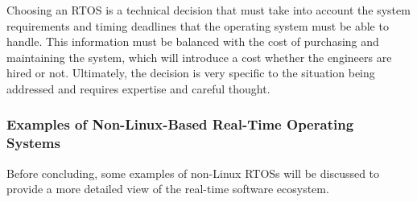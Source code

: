                 Choosing an RTOS is a technical decision that must take into
                    account the system requirements and timing deadlines that
                    the operating system must be able to handle.
                This information must be balanced with the cost of purchasing
                    and maintaining the system, which will introduce a cost
                    whether the engineers are hired or not.
                Ultimately, the decision is very specific to the situation being
                    addressed and requires expertise and careful thought.

            \subsubsection{Examples of Non-Linux-Based Real-Time Operating Systems}
            \markboth{}{}
                Before concluding, some examples of non-Linux RTOSs will be
                    discussed to provide a more detailed view of the real-time
                    software ecosystem.

